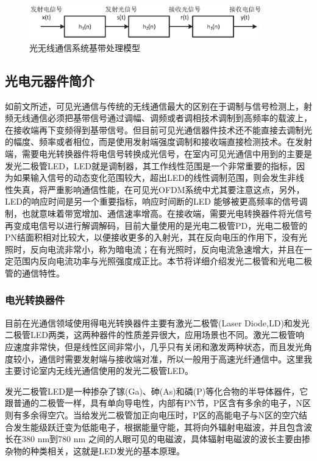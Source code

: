 \begin{figure}[htbp]
\centering
\includegraphics[width=0.9\textwidth]{figures/chapter-2/BasebandModle.eps}
\caption{光无线通信系统基带处理模型}
\label{fig:BasebandModle}
\end{figure}

\subsection{光电元器件简介}
如前文所述，可见光通信与传统的无线通信最大的区别在于调制与信号检测上，射频无线通信必须把基带信号通过调幅、调频或者调相技术调制到高频率的载波上，在接收端再下变频得到基带信号。但目前可见光通信器件技术还不能直接去调制光的幅度、频率或者相位，而是使用发射端强度调制和接收端直接检测技术。在发射端，需要电光转换器件将电信号转换成光信号，在室内可见光通信中用到的主要是发光二极管LED，LED就是调制器，其工作线性范围是一个非常重要的指标，因为如果输入信号的动态变化范围较大，超出LED的线性调制范围，则会发生非线性失真，将严重影响通信性能，在可见光OFDM系统中尤其要注意这点，另外，LED的响应时间是另一个重要指标，响应时间断的LED 能够被更高频率的信号调制，也就意味着带宽增加、通信速率增高。在接收端，需要光电转换器件将光信号再变成电信号以进行解调解码，目前大量使用的是光电二极管PD，光电二极管的PN结面积相对比较大，以便接收更多的入射光，其在反向电压的作用下，没有光照时，反向电流非常小，称为暗电流；在有光照时，反向电流急速增大，并且在一定范围内反向电流功率与光照强度成正比。本节将详细介绍发光二极管和光电二极管的通信特性。
\subsubsection{电光转换器件}
目前在光通信领域使用得电光转换器件主要有激光二极管(Laser Diode,LD)和发光二极管LED两类，这两种器件的性质差异很大，应用场景也不同。激光二极管响应速度非常快，但是线性区间非常小，几乎只有关闭和激发两种状态，而且发光角度较小，通信时需要发射端与接收端对准，所以一般用于高速光纤通信中。这里我主要讨论室内无线光通信使用的发光二极管LED。

发光二极管LED是一种掺杂了镓(Ga)、砷(As)和磷(P)等化合物的半导体器件，它跟普通的二极管一样，具有单向导电性，内部有PN节，P区含有多余的电子，N区则有多余得空穴。当给发光二极管加正向电压时，P区的高能电子与N区的空穴结合发生能级跃迁变为低能电子，根据能量守能，其将向外辐射电磁波，并且包含波长在380 nm到780 nm 之间的人眼可见的电磁波，具体辐射电磁波的波长主要由掺杂物的种类相关，这就是LED发光的基本原理。

